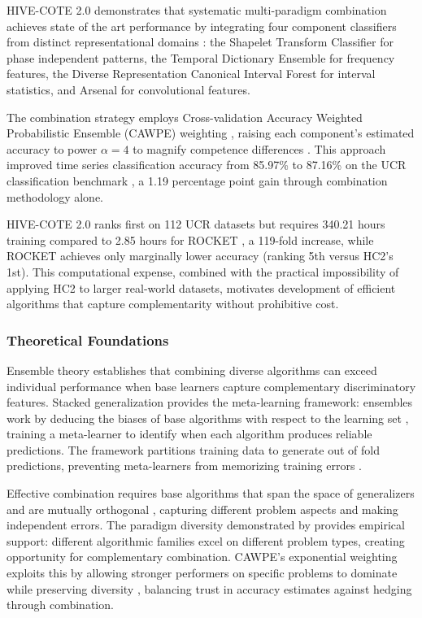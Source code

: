 \documentclass[pdflatex,sn-basic]{sn-jnl}           %
\theoremstyle{thmstyleone}%
\theoremstyle{thmstyletwo}%
\theoremstyle{thmstylethree}%
\begin{document}
HIVE-COTE 2.0 demonstrates that systematic multi-paradigm combination achieves state of the art performance by integrating four component classifiers from distinct representational domains \citep[p.~3]{hive-cote-2}: the Shapelet Transform Classifier for phase independent patterns, the Temporal Dictionary Ensemble for frequency features, the Diverse Representation Canonical Interval Forest for interval statistics, and Arsenal for convolutional features.

The combination strategy employs Cross-validation Accuracy Weighted Probabilistic Ensemble (CAWPE) weighting \citep{cawpe}, raising each component's estimated accuracy to power $\alpha=4$ to magnify competence differences \citep[p.~1675]{cawpe}. This approach improved time series classification accuracy from 85.97\% to 87.16\% on the UCR classification benchmark \citep[Figure~8, p.~1692]{cawpe}, a 1.19 percentage point gain through combination methodology alone.

HIVE-COTE 2.0 ranks first on 112 UCR datasets \citep[p.~3]{hive-cote-2} but requires 340.21 hours training compared to 2.85 hours for ROCKET \citep[Table~4, p.~18]{hive-cote-2}, a 119-fold increase, while ROCKET achieves only marginally lower accuracy (ranking 5th versus HC2's 1st). This computational expense, combined with the practical impossibility of applying HC2 to larger real-world datasets, motivates development of efficient algorithms that capture complementarity without prohibitive cost.

\subsubsection{Theoretical Foundations}

Ensemble theory establishes that combining diverse algorithms can exceed individual performance when base learners capture complementary discriminatory features. Stacked generalization \citep{stacked-generalization} provides the meta-learning framework: ensembles work by deducing the biases of base algorithms with respect to the learning set \citep[p.~241]{stacked-generalization}, training a meta-learner to identify when each algorithm produces reliable predictions. The framework partitions training data to generate out of fold predictions, preventing meta-learners from memorizing training errors \citep[p.~244]{stacked-generalization}.

Effective combination requires base algorithms that span the space of generalizers and are mutually orthogonal \citep[p.~256]{stacked-generalization}, capturing different problem aspects and making independent errors. The paradigm diversity demonstrated by \citet[Table~11, p.~648]{tsc-bakeoff} provides empirical support: different algorithmic families excel on different problem types, creating opportunity for complementary combination. CAWPE's exponential weighting exploits this by allowing stronger performers on specific problems to dominate while preserving diversity \citep[p.~1675]{cawpe}, balancing trust in accuracy estimates against hedging through combination.
\end{document}
